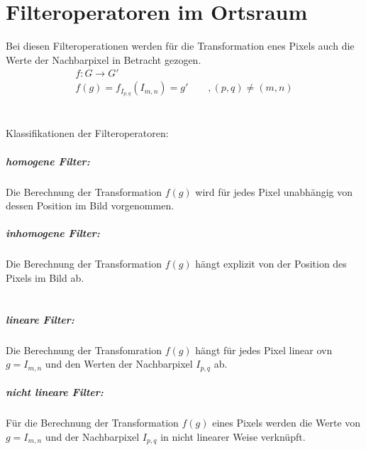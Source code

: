 



\chapter{Filteroperatoren im Ortsraum}
Bei diesen Filteroperationen werden für die Transformation enes Pixels auch die Werte der Nachbarpixel in Betracht gezogen.
\[\begin{aligned}
	f:G \rightarrow G'\\
	f(g) = f_{I_{p,q}} (I_{m,n}) = g' \qquad , (p,q) \neq (m,n)
\end{aligned}\]
~\\\\
Klassifikationen der Filteroperatoren:\\
\paragraph{homogene Filter:\\}
Die Berechnung der Transformation $f(g)$ wird für jedes Pixel unabhängig von dessen Position im Bild vorgenommen.\\
\paragraph{inhomogene Filter:\\}
Die Berechnung der Transformation $f(g)$ hängt explizit von der Position des Pixels im Bild ab.\\
\\
\paragraph{lineare Filter:\\}
Die Berechnung der Transfomration $f(g)$ hängt für jedes Pixel linear ovn $g=I_{m,n}$ und den Werten der Nachbarpixel $I_{p,q}$ ab.\\
\paragraph{nicht lineare Filter:\\}
Für die Berechnung der Transformation $f(g)$ eines Pixels werden die Werte von $g=I_{m,n}$ und der Nachbarpixel $I_{p,q}$ in nicht linearer Weise verknüpft.

